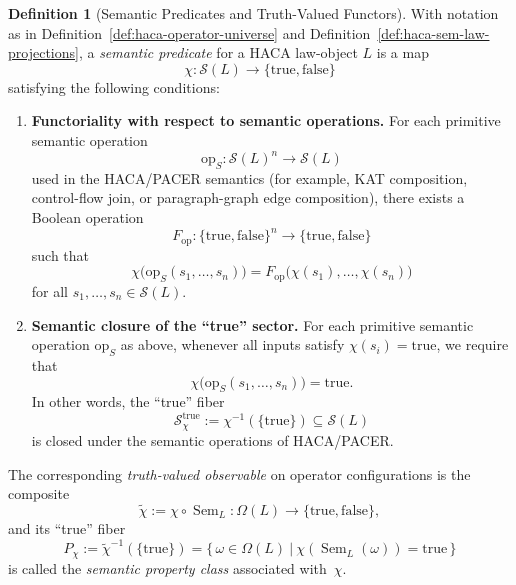 \documentclass[11pt]{book}
\theoremstyle{plain}
\theoremstyle{definition}
\newtheorem{definition}[theorem]{Definition}
\theoremstyle{remark}
\begin{document}
\begin{definition}[Semantic Predicates and Truth-Valued Functors]
\label{def:haca-semantic-predicates}
With notation as in Definition~\ref{def:haca-operator-universe}
and Definition~\ref{def:haca-sem-law-projections}, a
\emph{semantic predicate} for a HACA law-object $L$ is a map
\[
  \chi:\mathcal{S}(L)\longrightarrow \{\mathrm{true},\mathrm{false}\}
\]
satisfying the following conditions:
\begin{enumerate}
  \item \textbf{Functoriality with respect to semantic operations.}
        For each primitive semantic operation
        \[
          \mathrm{op}_S : \mathcal{S}(L)^n \longrightarrow \mathcal{S}(L)
        \]
        used in the HACA/PACER semantics (for example, KAT composition,
        control-flow join, or paragraph-graph edge composition), there
        exists a Boolean operation
        \[
          F_{\mathrm{op}} : \{\mathrm{true},\mathrm{false}\}^n
          \longrightarrow \{\mathrm{true},\mathrm{false}\}
        \]
        such that
        \[
          \chi\bigl(\mathrm{op}_S(s_1,\dots,s_n)\bigr)
          =
          F_{\mathrm{op}}\bigl(\chi(s_1),\dots,\chi(s_n)\bigr)
        \]
        for all $s_1,\dots,s_n\in\mathcal{S}(L)$.
  \item \textbf{Semantic closure of the ``true'' sector.}
        For each primitive semantic operation $\mathrm{op}_S$ as above,
        whenever all inputs satisfy $\chi(s_i)=\mathrm{true}$, we require
        that
        \[
          \chi\bigl(\mathrm{op}_S(s_1,\dots,s_n)\bigr)
          = \mathrm{true}.
        \]
        In other words, the ``true'' fiber
        \[
          \mathcal{S}_\chi^{\mathrm{true}}
          :=
          \chi^{-1}(\{\mathrm{true}\})
          \subseteq \mathcal{S}(L)
        \]
        is closed under the semantic operations of HACA/PACER.
\end{enumerate}
The corresponding \emph{truth-valued observable} on operator
configurations is the composite
\[
  \tilde{\chi}
  :=
  \chi \circ \operatorname{Sem}_L :
  \Omega(L) \longrightarrow \{\mathrm{true},\mathrm{false}\},
\]
and its ``true'' fiber
\[
  P_\chi
  :=
  \tilde{\chi}^{-1}(\{\mathrm{true}\})
  =
  \bigl\{\, \omega\in\Omega(L)\ \big|\ \chi(\operatorname{Sem}_L(\omega))
  = \mathrm{true} \,\bigr\}
\]
is called the \emph{semantic property class} associated with~$\chi$.

\end{definition}
\end{document}
